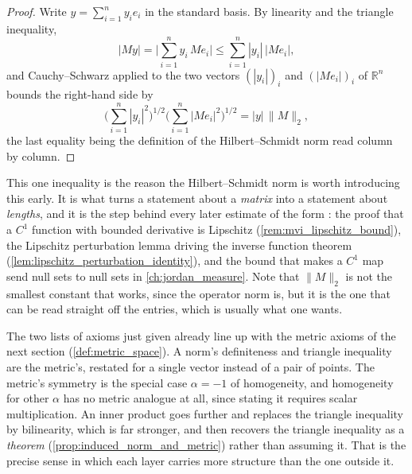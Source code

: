 \begin{proof}
Write $y = \sum_{i=1}^n y_ie_i$ in the standard basis. By linearity and the triangle inequality,
\[|My| = \Big|\sum_{i=1}^n y_i\,Me_i\Big| \leq \sum_{i=1}^n |y_i|\,|Me_i|,\]
and Cauchy--Schwarz applied to the two vectors $(|y_i|)_i$ and $(|Me_i|)_i$ of $\mathbb{R}^n$
bounds the right-hand side by
\[\Big(\sum_{i=1}^n |y_i|^2\Big)^{1/2}\Big(\sum_{i=1}^n |Me_i|^2\Big)^{1/2} = |y|\,\|M\|_2,\]
the last equality being the definition of the Hilbert--Schmidt norm read column by column.
\end{proof}

\begin{remark}
\label{rem:why_hilbert_schmidt}
This one inequality is the reason the Hilbert--Schmidt norm is worth introducing this early. It
is what turns a statement about a \emph{matrix} into a statement about \emph{lengths}, and it is
the step behind every later estimate of the form : the
proof that a $C^1$ function with bounded derivative is Lipschitz
(\cref{rem:mvi_lipschitz_bound}), the Lipschitz perturbation lemma driving the inverse function
theorem (\cref{lem:lipschitz_perturbation_identity}), and the bound that makes a $C^1$ map send
null sets to null sets in \cref{ch:jordan_measure}. Note that $\|M\|_2$ is not the smallest
constant that works, since the operator norm is, but it is the one that can be read straight off
the entries, which is usually what one wants.
\end{remark}

The two lists of axioms just given already line up with the metric axioms of the next section
(\cref{def:metric_space}). A norm's definiteness and triangle inequality are the metric's,
restated for a single vector instead of a pair of points. The metric's symmetry is the special
case $\alpha = -1$ of homogeneity, and homogeneity for other $\alpha$ has no metric analogue at
all, since stating it requires scalar multiplication. An inner product goes further and replaces
the triangle inequality by bilinearity, which is far stronger, and then recovers the triangle
inequality as a \emph{theorem} (\cref{prop:induced_norm_and_metric}) rather than assuming it. That
is the precise sense in which each layer carries more structure than the one outside it.

